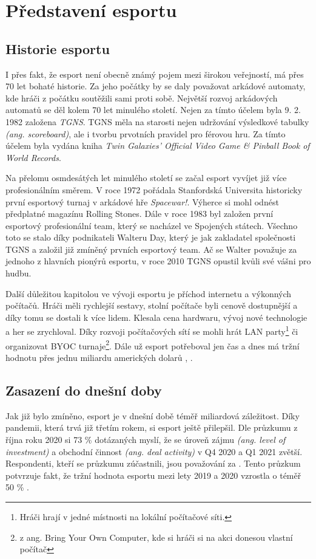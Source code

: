\chapter{Představení esportu}
\section{Historie esportu}
I přes fakt, že esport není obecně známý pojem mezi širokou veřejností, má přes 70 let bohaté historie. Za jeho počátky by se
daly považovat arkádové automaty, kde hráči z počátku soutěžili sami proti sobě. Největší rozvoj arkádových automatů se děl kolem 70 let minulého 
století. Nejen za tímto účelem byla 9. 2. 1982 založena \textit{\ac{TGNS}}. \ac{TGNS} měla na starosti nejen udržování výsledkové tabulky \textit{(ang. scoreboard)},
ale i tvorbu prvotních pravidel pro férovou hru. Za tímto účelem byla vydána kniha \textit{Twin Galaxies' Official Video Game \& Pinball Book of World Records}.

Na přelomu osmdesátých let minulého století se začal esport vyvíjet již více profesionálním směrem. V roce 1972 pořádala Stanfordská Universita historicky první
esportový turnaj v arkádové hře \textit{Spacewar!}. Výherce si mohl odnést předplatné magazínu Rolling Stones. Dále v roce 1983 byl založen první esportový profesionální team,
který se nacházel ve Spojených státech. Všechno toto se stalo díky podnikateli Walteru Day, který je jak zakladatel společnosti \ac{TGNS} a založil již zmíněný
prvních esportový team. Ač se Walter považuje za jednoho z hlavních pionýrů esportu, v roce 2010 \ac{TGNS} opustil kvůli své vášni pro hudbu.

Další důležitou kapitolou ve vývoji esportu je příchod internetu a výkonných počítačů. Hráči měli rychlejší sestavy, stolní počítače byli cenově dostupnější a díky tomu
se dostali k více lidem. Klesala cena hardwaru, vývoj nové technologie a her se zrychloval. Díky rozvoji počítačových sítí se mohli hrát LAN party\footnote{Hráči hrají v jedné
místnosti na lokální počítačové síti.} či organizovat BYOC turnaje\footnote{z ang. Bring Your Own Computer, kde si hráči si na akci donesou vlastní počítač}. Dále už esport 
potřeboval jen čas a dnes má tržní hodnotu přes jednu miliardu amerických dolarů \cite{Gough2021}, \cite{Larch2019}.

\section{Zasazení do dnešní doby}
Jak již bylo zmíněno, esport je v dnešní době téměř miliardová záležitost. Díky pandemii, která trvá již třetím rokem, si esport ještě přilepšil. Dle průzkumu \cite{Gough2021a}
z října roku 2020 si 73 \% dotázaných myslí, že se úroveň zájmu \textit{(ang. level of investment)} a obchodní činnost \textit{(ang. deal activity)} v Q4 2020 a Q1 2021
zvětší. Respondenti, kteří se průzkumu zúčastnili, jsou považování za . Tento průzkum potvrzuje fakt, že tržní hodnota esportu mezi lety 2019 a 2020
vzrostla o téměř 50 \% \cite{Gough2021}.

